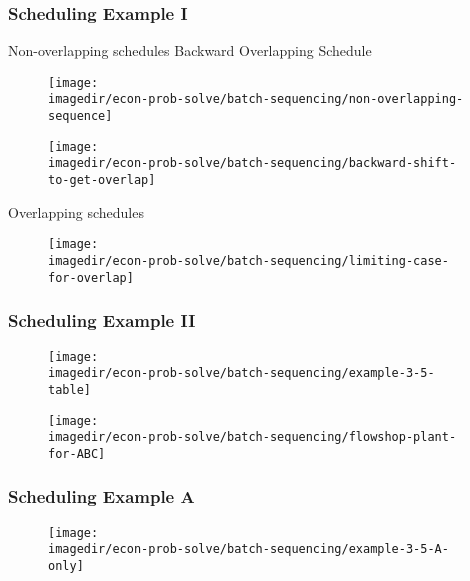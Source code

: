\begin{frame}\frametitle{Scheduling Example I}
	
	Non-overlapping schedules \; Backward Overlapping Schedule
	\begin{figure}
		[!htb] 
		\begin{center}
			\texttt{[image: \\imagedir/econ-prob-solve/batch-sequencing/non-overlapping-sequence]}
			
			
			\texttt{[image: \\imagedir/econ-prob-solve/batch-sequencing/backward-shift-to-get-overlap]}
			
			\label{fig:Eg1} 
		\end{center}
	\end{figure}
	
	Overlapping schedules
	\begin{figure}
		[!htb] 
		\begin{center}
			\texttt{[image: \\imagedir/econ-prob-solve/batch-sequencing/limiting-case-for-overlap]}
			
			\label{fig:Eg2} 
		\end{center}
	\end{figure}
\end{frame}

\begin{frame}\frametitle{Scheduling Example II}
	\begin{figure}
		[!htb] 
		\begin{center}
			\texttt{[image: \\imagedir/econ-prob-solve/batch-sequencing/example-3-5-table]}
			
			\label{fig:Eg3} 
		\end{center}
	\end{figure}
	\begin{figure}
		[!htb] 
		\begin{center}
			\texttt{[image: \\imagedir/econ-prob-solve/batch-sequencing/flowshop-plant-for-ABC]}
			
			\label{fig:Eg3pfd} 
		\end{center}
	\end{figure}
\end{frame}

\begin{frame}\frametitle{Scheduling Example A}
	\begin{figure}
		[!htb] 
		\begin{center}
			\texttt{[image: \\imagedir/econ-prob-solve/batch-sequencing/example-3-5-A-only]}
			
			\label{fig:Eg4} 
		\end{center}
	\end{figure}
\end{frame}

